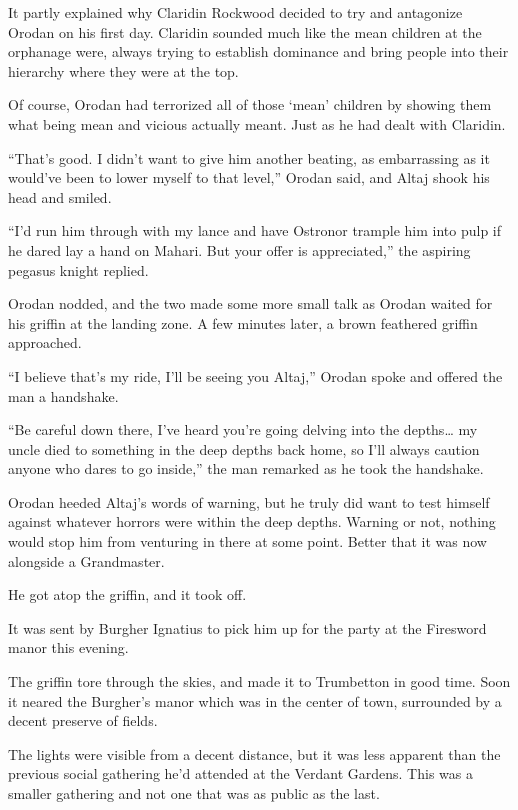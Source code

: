 \documentclass[a4paper,10pt]{book}
\begin{document}
It partly explained why Claridin Rockwood decided to try and antagonize Orodan on his first day. Claridin sounded much like the mean children at the orphanage were, always trying to establish dominance and bring people into their hierarchy where they were at the top.\par
Of course, Orodan had terrorized all of those ‘mean’ children by showing them what being mean and vicious actually meant. Just as he had dealt with Claridin.\par
“That’s good. I didn’t want to give him another beating, as embarrassing as it would’ve been to lower myself to that level,” Orodan said, and Altaj shook his head and smiled.\par
“I’d run him through with my lance and have Ostronor trample him into pulp if he dared lay a hand on Mahari. But your offer is appreciated,” the aspiring pegasus knight replied.\par
Orodan nodded, and the two made some more small talk as Orodan waited for his griffin at the landing zone. A few minutes later, a brown feathered griffin approached.\par
“I believe that’s my ride, I’ll be seeing you Altaj,” Orodan spoke and offered the man a handshake.\par
“Be careful down there, I’ve heard you’re going delving into the depths… my uncle died to something in the deep depths back home, so I’ll always caution anyone who dares to go inside,” the man remarked as he took the handshake.\par
Orodan heeded Altaj’s words of warning, but he truly did want to test himself against whatever horrors were within the deep depths. Warning or not, nothing would stop him from venturing in there at some point. Better that it was now alongside a Grandmaster.\par
He got atop the griffin, and it took off.\par
It was sent by Burgher Ignatius to pick him up for the party at the Firesword manor this evening.\par
The griffin tore through the skies, and made it to Trumbetton in good time. Soon it neared the Burgher’s manor which was in the center of town, surrounded by a decent preserve of fields.\par
The lights were visible from a decent distance, but it was less apparent than the previous social gathering he’d attended at the Verdant Gardens. This was a smaller gathering and not one that was as public as the last.\par
\end{document}
